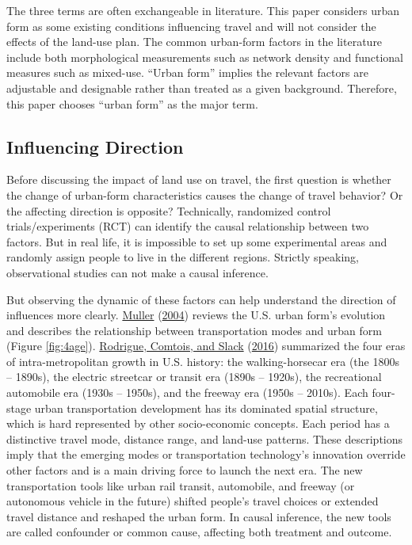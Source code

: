 \documentclass[
  12pt,
]{article}
\begin{document}
The three terms are often exchangeable in literature. This paper considers urban form as some existing conditions influencing travel and will not consider the effects of the land-use plan. The common urban-form factors in the literature include both morphological measurements such as network density and functional measures such as mixed-use. ``Urban form'' implies the relevant factors are adjustable and designable rather than treated as a given background. Therefore, this paper chooses ``urban form'' as the major term.

\hypertarget{influencing-direction}{%
\subsection{Influencing Direction}\label{influencing-direction}}

Before discussing the impact of land use on travel, the first question is whether the change of urban-form characteristics causes the change of travel behavior? Or the affecting direction is opposite? Technically, randomized control trials/experiments (RCT) can identify the causal relationship between two factors. But in real life, it is impossible to set up some experimental areas and randomly assign people to live in the different regions. Strictly speaking, observational studies can not make a causal inference.

But observing the dynamic of these factors can help understand the direction of influences more clearly. \protect\hyperlink{ref-mullerTransportationUrbanForm2004}{Muller} (\protect\hyperlink{ref-mullerTransportationUrbanForm2004}{2004}) reviews the U.S. urban form's evolution and describes the relationship between transportation modes and urban form (Figure \ref{fig:4age}). \protect\hyperlink{ref-rodrigueGeographyTransportSystems2016}{Rodrigue, Comtois, and Slack} (\protect\hyperlink{ref-rodrigueGeographyTransportSystems2016}{2016}) summarized the four eras of intra-metropolitan growth in U.S. history: the walking-horsecar era (the 1800s -- 1890s), the electric streetcar or transit era (1890s -- 1920s), the recreational automobile era (1930s -- 1950s), and the freeway era (1950s -- 2010s). Each four-stage urban transportation development has its dominated spatial structure, which is hard represented by other socio-economic concepts. Each period has a distinctive travel mode, distance range, and land-use patterns. These descriptions imply that the emerging modes or transportation technology's innovation override other factors and is a main driving force to launch the next era. The new transportation tools like urban rail transit, automobile, and freeway (or autonomous vehicle in the future) shifted people's travel choices or extended travel distance and reshaped the urban form. In causal inference, the new tools are called confounder or common cause, affecting both treatment and outcome.
\end{document}
